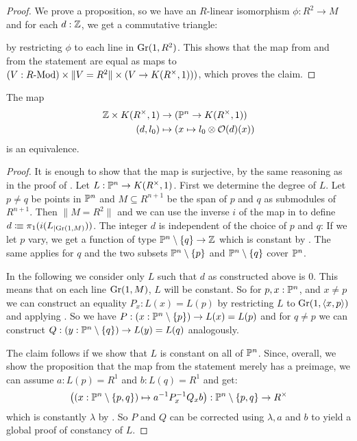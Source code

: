\begin{proof}
  We prove a proposition, so we have an $R$-linear isomorphism $\phi:R^2\to M$ and for each $d:\mathbb{Z}$, we get a commutative triangle:
  \begin{center}
\end{center}
by restricting $\phi$ to each line in $\mathrm{Gr}(1,R^2)$.
This shows that the map from  and from the statement are equal as maps to $(V:R\text{-}\mathrm{Mod})\times \|V=R^2\| \times (V\to K(R^{\times},1)))$,
which proves the claim.
\end{proof}

\begin{theorem}
  The map
  \begin{align*}
    \mathbb{Z}\times K(R^{\times},1) &\to (\mathbb{P}^n\to K(R^{\times},1)) \\
    (d,l_0) &\mapsto (x\mapsto l_0\otimes \mathcal{O}(d)(x))
  \end{align*}
  is an equivalence.
\end{theorem}

\begin{proof}
  It is enough to show that the map is surjective, by the same reasoning as in the proof of .
  Let $L:\mathbb{P}^n\to K(R^{\times},1)$. First we determine the degree of $L$.
  Let $p\neq q$ be points in $\mathbb{P}^n$ and $M\subseteq R^{n+1}$ be the span of $p$ and $q$ as submodules of $R^{n+1}$.
  Then $\|M=R^2\|$ and we can use the inverse $i$ of the map in  to define $d\vcentcolon\mspace{-1.2mu}\equiv \pi_1(i(L_{|\mathrm{Gr}(1,M)}))$.
  The integer $d$ is independent of the choice of $p$ and $q$:
  If we let $p$ vary, we get a function of type $\mathbb{P}^n\setminus\{q\}\to \mathbb{Z}$ which is constant by .
  The same applies for $q$
  and the two subsets $\mathbb{P}^n\setminus\{p\}$ and $\mathbb{P}^n\setminus\{q\}$ cover $\mathbb{P}^n$.

  In the following we consider only $L$ such that $d$ as constructed above is $0$.
  This means that on each line $\mathrm{Gr}(1,M)$, $L$ will be constant.
  So for $p,x:\mathbb{P}^n$,
  and $x\neq p$ we can construct an equality $P_x:L(x)=L(p)$  by restricting $L$ to $\mathrm{Gr}(1,\langle x,p\rangle)$ and applying .
  So we have $P:(x:\mathbb{P}^n\setminus\{p\})\to L(x)=L(p)$ and for $q\neq p$ we can construct
  $Q:(y:\mathbb{P}^n\setminus\{q\})\to L(y)=L(q)$ analogously.
  
  The claim follows if we show that $L$ is constant on all of $\mathbb{P}^n$.
  Since, overall, we show the proposition that the map from the statement merely has a preimage,
  we can assume $a:L(p)=R^1$ and $b:L(q)=R^1$ and get:
  \[ \left((x:\mathbb{P}^n\setminus\{p,q\})\mapsto a^{-1}P_x^{-1}Q_xb\right) : \mathbb{P}^n\setminus\{p,q\} \to R^\times\]
  which is constantly $\lambda$ by .
  So $P$ and $Q$ can be corrected using $\lambda,a$ and $b$ to yield a global proof of constancy of $L$.
\end{proof}